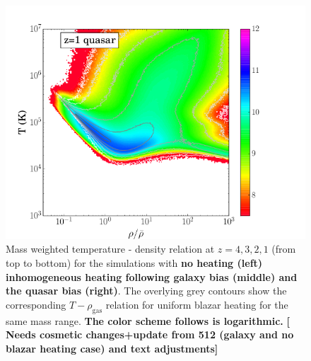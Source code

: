 \documentclass[numberedappendix]{emulateapj}
\newcommand\ALc[1]{{\color{red} \bf #1}} %
\begin{document}
{\begin{figure}
\includegraphics[trim=.5cm 0cm 3cm .5cm, clip ,width = .32\textwidth ]{T_rho_qso_z1_512.png}
\caption{Mass weighted temperature - density relation at $z=4,3,2,1$ (from top to bottom) for the simulations with \ALc{no heating (left) inhomogeneous heating following galaxy bias (middle) and the quasar bias (right)}. The overlying grey contours show the corresponding $T-\rho_{\mathrm{gas}}$ relation for uniform blazar heating \citep{2012MNRAS.423..149P} for the same mass range. \ALc{The color scheme follows is logarithmic.}\ALc{[{ Needs cosmetic changes+update from 512 (galaxy and no blazar heating case) and text adjustments}]}}
\label{fig:T_rho}
\end{figure}

}
\end{document}
